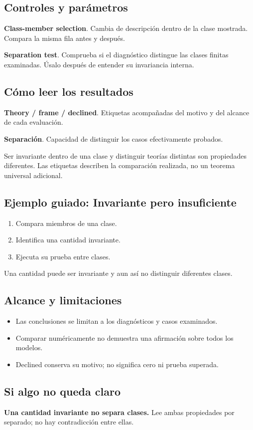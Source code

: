 \documentclass[11pt,a4paper]{article}
\begin{document}
\subsection*{Controles y parámetros}
\textbf{Class-member selection}. Cambia de descripción dentro de la clase mostrada. Compara la misma fila antes y después.

\textbf{Separation test}. Comprueba si el diagnóstico distingue las clases finitas examinadas. Úsalo después de entender su invariancia interna.

\subsection*{Cómo leer los resultados}
\textbf{Theory / frame / declined}. Etiquetas acompañadas del motivo y del alcance de cada evaluación.

\textbf{Separación}. Capacidad de distinguir los casos efectivamente probados.

Ser invariante dentro de una clase y distinguir teorías distintas son propiedades diferentes. Las etiquetas describen la comparación realizada, no un teorema universal adicional.
\subsection*{Ejemplo guiado: Invariante pero insuficiente}
\begin{enumerate}
\item Compara miembros de una clase.
\item Identifica una cantidad invariante.
\item Ejecuta su prueba entre clases.
\end{enumerate}
Una cantidad puede ser invariante y aun así no distinguir diferentes clases.
\subsection*{Alcance y limitaciones}
\begin{itemize}
\item Las conclusiones se limitan a los diagnósticos y casos examinados.
\item Comparar numéricamente no demuestra una afirmación sobre todos los modelos.
\item Declined conserva su motivo; no significa cero ni prueba superada.
\end{itemize}
\subsection*{Si algo no queda claro}
\textbf{Una cantidad invariante no separa clases.} Lee ambas propiedades por separado; no hay contradicción entre ellas.
\end{document}
